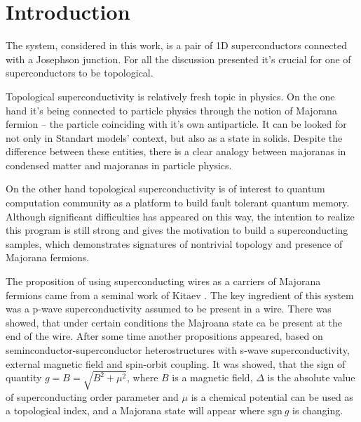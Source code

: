 \chapter{Introduction}


The system, considered in this work, is a pair of 1D superconductors connected with a Josephson junction. For all the discussion presented it's crucial for one of superconductors to be topological. 

Topological superconductivity is relatively fresh topic in physics. On the one hand it's being connected to particle physics through the notion of Majorana fermion -- the particle coinciding with it's own antiparticle\cite{Majorana_1937}. It can be looked for not only in Standart models' context\cite{particle_majorana_Avignone}\cite{particle_majorana_Giuliani}\cite{particle_majorana_Marcocci}, but also as a state in solids\cite{majorana_condmat_Rossi}\cite{majorana_condmat_Kitaev}\cite{majorana_condmat_Kopnin}\cite{majorana_condmat_Motrunich}\cite{majorana_condmat_Nayak}\cite{majorana_condmat_Read_Green}\cite{majorana_condmat_Senthil}\cite{majorana_condmat_Volovik}\cite{majorana_condmat_Fu_Kane}. Despite the difference between these entities, there is a clear analogy between majoranas in condensed matter and majoranas in particle physics.

 On the other hand topological superconductivity is of interest to quantum computation community as a platform to build fault tolerant quantum memory. Although significant difficulties has appeared on this way, the intention to realize this program is still strong and gives the motivation to build a superconducting samples, which demonstrates signatures of nontrivial topology and presence of Majorana fermions.

The proposition of using superconducting wires as a carriers of Majorana fermions came from a seminal work of Kitaev \cite{majorana_condmat_Kitaev}. The key ingredient of this system was a p-wave superconductivity assumed to be present in a wire. There was showed, that under certain conditions the Majroana state ca be present at the end of the wire. After some time another propositions\cite{Oreg_2010}\cite{Lutchyn_2010} appeared, based on seminconductor-superconductor heterostructures with s-wave superconductivity, external magnetic field and spin-orbit coupling. It was showed, that the sign of quantity $ g=B=\sqrt{B^2+\mu^2} $, where $ B $ is a magnetic field, $ \Delta $ is the absolute value of superconducting order parameter and $ \mu $ is a chemical potential can be used as a topological index, and a Majorana state will appear where $ \mathrm{sgn}~g $ is changing.

